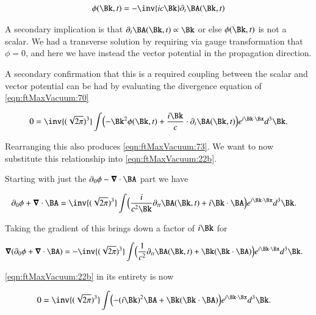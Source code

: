 \begin{align}
\label{eqn:ftMaxVacuum:73}
\phi(\Bk, t) = -\inv{i c \Bk} \partial_t \BA(\Bk, t)
\end{align}

A secondary implication is that $\partial_t \BA(\Bk, t) \propto \Bk$ or else $\phi(\Bk, t)$ is not a scalar.  We had a transverse solution by requiring via gauge transformation that $\phi = 0$, and here we have instead the vector potential in the propagation direction.

A secondary confirmation that this is a required coupling between the scalar and vector potential can be had by evaluating the divergence equation of \autoref{eqn:ftMaxVacuum:70}

\begin{align}\label{eqn:ftMaxVacuum:72b}
0 = 
\inv{(\sqrt{2 \pi})^3} \int 
\Bigl(
- \Bk^2 \phi(\Bk, t) + \frac{i\Bk}{c} \cdot \partial_t \BA(\Bk, t)
\Bigr)
e^{i \Bk \cdot \Bx } d^3 \Bk.
\end{align}

Rearranging this also produces \autoref{eqn:ftMaxVacuum:73}.  We want to now substitute this relationship into \autoref{eqn:ftMaxVacuum:22b}.

Starting with just the $\partial_0 \phi - \spacegrad \cdot \BA$ part we have

\begin{align}\label{eqn:ftMaxVacuum:74}
\partial_0 \phi + \spacegrad \cdot \BA
&=
\inv{(\sqrt{2 \pi})^3} \int 
\Bigl(
\frac{i}{c^2 \Bk} \partial_{tt} \BA(\Bk, t) + i \Bk \cdot \BA
\Bigr)
e^{i \Bk \cdot \Bx } d^3 \Bk.
\end{align}

Taking the gradient of this brings down a factor of $i\Bk$ for

\begin{align}\label{eqn:ftMaxVacuum:74b}
\spacegrad (\partial_0 \phi + \spacegrad \cdot \BA)
&=
-\inv{(\sqrt{2 \pi})^3} \int 
\Bigl(
\frac{1}{c^2} \partial_{tt} \BA(\Bk, t) + \Bk (\Bk \cdot \BA)
\Bigr)
e^{i \Bk \cdot \Bx } d^3 \Bk.
\end{align}

\autoref{eqn:ftMaxVacuum:22b} in its entirety is now

\begin{align}\label{eqn:ftMaxVacuum:75}
0 &=
\inv{(\sqrt{2 \pi})^3} \int 
\Bigl(
- (i\Bk)^2 \BA
+ \Bk (\Bk \cdot \BA)
\Bigr)
e^{i \Bk \cdot \Bx } d^3 \Bk.
\end{align}

